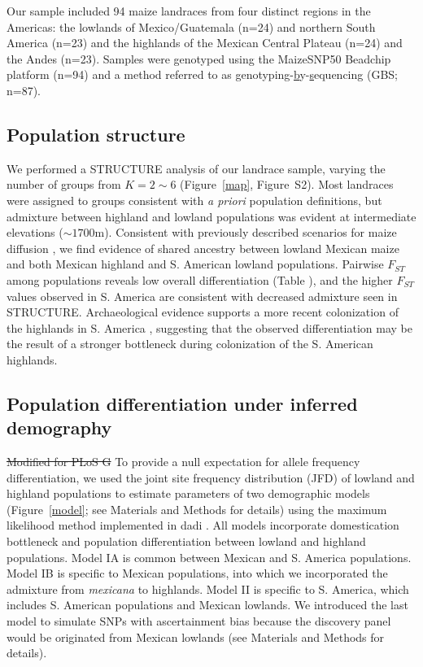 Our sample included 94 maize landraces from four distinct regions in the Americas: the lowlands of Mexico/Guatemala (n=24) and northern South America (n=23) and the highlands of the Mexican Central Plateau (n=24) and the Andes (n=23). Samples were genotyped using the MaizeSNP50 Beadchip platform (n=94) and a method referred to as \underline{g}enotyping-\underline{b}y-\underline{s}equencing (GBS; n=87).

\subsection*{Population structure}

We performed a {\sf STRUCTURE} analysis \cite[]{Pritchard_2000_10835412,Falush_2003_12930761} of our landrace sample, varying the number of groups from $K=2\sim 6$ (Figure~\ref{map}, Figure~S2). 
Most landraces were assigned to groups consistent with \emph{a priori} population definitions, but admixture between highland and lowland populations was evident at intermediate elevations ($\sim1700$m).  Consistent with previously described scenarios for maize diffusion \cite[]{Piperno_2006_69}, we find evidence of shared ancestry between lowland Mexican maize and both Mexican highland and S. American lowland populations.  Pairwise $F_{ST}$ among populations reveals low overall differentiation (Table \label{FstP}), and the higher $F_{ST}$ values observed in S. America are consistent with decreased admixture seen in STRUCTURE.  Archaeological evidence supports a more recent colonization of the highlands in S. America  \cite[]{Piperno_2006_69,Perry_2006_16511492,Grobman_2012_22307642}, suggesting that the observed differentiation may be the result of a stronger bottleneck during colonization of the S. American highlands. 

\subsection*{Population differentiation under inferred demography}

\st{Modified for PLoS G}
To provide a null expectation for allele frequency differentiation, we used the joint site frequency distribution (JFD) of lowland and highland populations to estimate parameters of two demographic models (Figure~\ref{model}; see Materials and Methods for details) using the maximum likelihood method implemented in {\sf dadi} \citep{Gutenkunst_2009_19851460}.  
All models incorporate domestication bottleneck \cite[]{Wright_2005_15919994} and population differentiation between lowland and highland populations.
Model IA is common between Mexican and S. America populations.
Model IB is specific to Mexican populations, into which we incorporated the admixture from \emph{mexicana} to highlands.
Model II is specific to S. America, which includes S. American populations and Mexican lowlands.  
We introduced the last model to simulate SNPs with ascertainment bias because the discovery panel would be originated from Mexican lowlands (see Materials and Methods for details).

